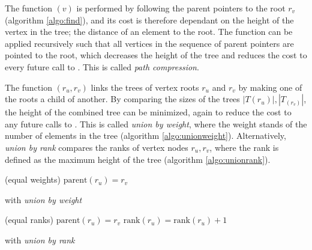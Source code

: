 The function $(v)$ is performed by following the parent pointers to the root $r_v$ (algorithm \ref{algo:find}), and its cost is therefore dependant on the height of the vertex in the tree; the distance of an element to the root. The function can be applied recursively such that all vertices in the sequence of parent pointers are pointed to the root, which decreases the height of the tree and reduces the cost to every future call to . This is called \emph{path compression}. 
\begin{algorithm}[h]
  \BlankLine
  \BlankLine
  \BlankLine
  \caption{}\label{algo:find}
\end{algorithm}

The function $(r_u,r_v)$ links the trees of vertex roots $r_u$ and $r_v$ by making one of the roots a child of another. By comparing the sizes of the trees $|T(r_u)|, |T_(r_v)|$, the height of the combined tree can be minimized, again to reduce the cost to any future calls to . This is called \emph{union by weight}, where the weight stands of the number of elements in the tree (algorithm \ref{algo:unionweight}). Alternatively, \emph{union by rank} compares the ranks of vertex nodes $r_u,r_v$, where the rank is defined as the maximum height of the tree (algorithm \ref{algo:unionrank}).
\begin{algorithm}[h]
  \BlankLine
  \BlankLine
  \Else(equal weights){
    $\text{parent}(r_u)=r_v$ \;
  }
  \BlankLine
  \caption{ with \emph{union by weight}}\label{algo:unionweight}
\end{algorithm}

\begin{algorithm}[h]
  \BlankLine
  \BlankLine
  \Else(equal ranks){
    $\text{parent}(r_u)=r_v$ \;
    $\text{rank}(r_u) = \text{rank}(r_u) + 1$ \;
  }
  \BlankLine
  \caption{ with \emph{union by rank}}\label{algo:unionrank}
\end{algorithm}

